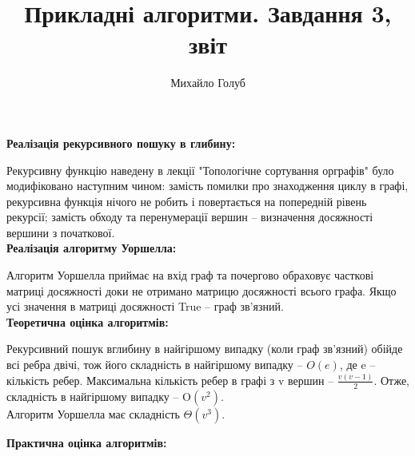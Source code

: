 \documentclass{article}
\title{Прикладні алгоритми. Завдання 3, звіт}
\author{Михайло Голуб}
\begin{document}
\maketitle
\newpage

\textbf{Реалізація рекурсивного пошуку в глибину:}\\\indent

Рекурсивну функцію наведену в лекції "Топологічне сортування орграфів" було модифіковано наступним чином: замість помилки про знаходження циклу в графі, рекурсивна функція нічого не робить і повертається на попередній рівень рекурсії; замість обходу та перенумерації вершин -- визначення досяжності вершини з початкової.\\

\textbf{Реалізація алгоритму Уоршелла:}\\\indent

Алгоритм Уоршелла приймає на вхід граф та почергово обраховує часткові матриці досяжності доки не отримано матрицю досяжності всього графа. Якщо усі значення в матриці досяжності True -- граф зв'язний.\\

\textbf{Теоретична оцінка алгоритмів:}\\\indent

Рекурсивний пошук вглибину в найгіршому випадку (коли граф зв'язний) обійде всі ребра двічі, тож його складність в найгіршому випадку -- $O(e)$, де e -- кількість ребер. Максимальна кількість ребер в графі з v вершин -- $\frac{v(v-1)}{2}$. Отже, складність в найгіршому випадку -- O$(v^2)$. \\\indent
Алгоритм Уоршелла має складність $\Theta(v^3)$.

\textbf{Практична оцінка алгоритмів:}\\\indent
\end{document}
